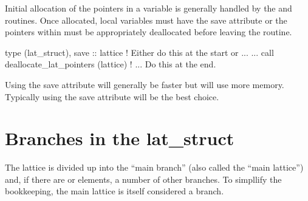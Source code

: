 Initial allocation of the pointers in a  variable is
generally handled by the  
and 
routines.  Once allocated, local  variables must have
the save attribute or the pointers within must be appropriately
deallocated before leaving the routine.
\begin{example}
  type (lat_struct), save :: lattice     ! Either do this at the start or ...
  ...
  call deallocate_lat_pointers (lattice) ! ... Do this at the end.
\end{example}
Using the save attribute will generally be faster but will use more
memory. Typically using the save attribute will be the best choice.

\section{Branches in the lat_struct}
\label {s:lat.struct}

The lattice is divided up into the ``main branch'' 
(also called the ``main lattice'') and, if there are
 or  elements, a number of other branches. 
To simpllify the bookkeeping, the main lattice is itself considered a branch.

